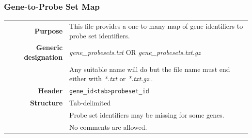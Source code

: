 \documentclass[a4paper,12pt]{article}
\begin{document}
\subsubsection{Gene-to-Probe Set Map}
\label{gep:gene}

\begin{tabular}{rp{12cm}}
\textbf{Purpose} & This file provides a one-to-many map of gene identifiers to probe set identifiers. \\
\textbf{Generic designation} & \textit{gene\_probesets.txt} OR \textit{gene\_probesets.txt.gz} \\
  & Any suitable name will do but the file name must end either with \textit{*.txt} or \textit{*.txt.gz}.. \\
\textbf{Header} & \texttt{gene\_id\textless tab\textgreater probeset\_id} \\
\textbf{Structure} & Tab-delimited \\
  & Probe set identifiers may be missing for some genes. \\
  & No comments are allowed. \\
\end{tabular}
\end{document}
